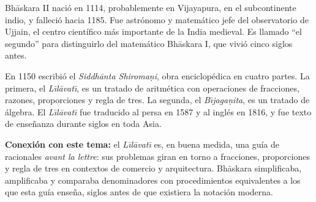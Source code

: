 \documentclass[11pt, letterpaper]{article}
\begin{document}
\vspace{0.7cm}

\begin{tcolorbox}[enhanced, breakable, colback=white, colframe=blockc,
  colbacktitle=blockc, coltitle=white, arc=4pt, leftrule=5pt,
  left=10pt, right=10pt, top=12pt, bottom=10pt, fonttitle=\bfseries,
  attach boxed title to top left={xshift=0.5cm, yshift*=-\tcboxedtitleheight/2},
  boxed title style={colframe=blockc, colback=blockc, arc=2pt},
  title={Bh\={a}skara II \hfill \normalfont\itshape 1114--c.\,1185 $\cdot$ India}]

\begin{minipage}[t]{0.78\linewidth}
\vspace{0pt}

Bh\={a}skara II naci\'o en 1114, probablemente en Vijayapura, en el subcontinente indio, y falleci\'o hacia 1185. Fue astr\'onomo y matem\'atico jefe del observatorio de Ujjain, el centro cient\'ifico m\'as importante de la India medieval. Es llamado ``el segundo'' para distinguirlo del matem\'atico Bh\={a}skara I, que vivi\'o cinco siglos antes.

\medskip
En 1150 escribi\'o el \textit{Siddh\={a}nta Shiroma\d{n}i}, obra enciclop\'edica en cuatro partes. La primera, el \textit{L\={\i}l\={a}vat\={\i}}, es un tratado de aritm\'etica con operaciones de fracciones, razones, proporciones y regla de tres. La segunda, el \textit{B\={\i}jaga\d{n}ita}, es un tratado de \'algebra. El \textit{L\={\i}l\={a}vat\={\i}} fue traducido al persa en 1587 y al ingl\'es en 1816, y fue texto de ense\~nanza durante siglos en toda Asia.

\medskip
\textbf{Conexi\'on con este tema:} el \textit{L\={\i}l\={a}vat\={\i}} es, en buena medida, una gu\'ia de racionales \textit{avant la lettre}: sus problemas giran en torno a fracciones, proporciones y regla de tres en contextos de comercio y arquitectura. Bh\={a}skara simplificaba, amplificaba y comparaba denominadores con procedimientos equivalentes a los que esta gu\'ia ense\~na, siglos antes de que existiera la notaci\'on moderna.
\end{minipage}
\hfill
\begin{minipage}[t]{0.18\linewidth}
\vspace{0pt}
\end{minipage}

\end{tcolorbox}
\end{document}
